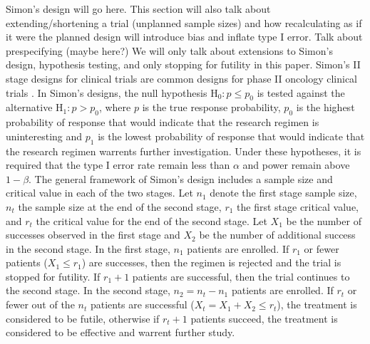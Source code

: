 \documentclass[12pt]{report}\usepackage[]{graphicx}\usepackage[]{color}
\newlength{\li}\setlength{\li}{14.48pt}
\newlength{\di}\setlength{\di}{-3.5mm}
\begin{document}
Simon's design will go here. This section will also talk about extending/shortening a trial (unplanned sample sizes) and how recalculating as if it were the planned design will introduce bias and inflate type I error. Talk about prespecifying (maybe here?)
\newline
We will only talk about extensions to Simon's design, hypothesis testing, and only stopping for futility in this paper.  
\newline
\textbf{}
\newline
\indent Simon's II stage designs for clinical trials are common designs for phase II oncology clinical trials \cite{Simon}. In Simon's designs, the null hypothesis $\mbox{H}_0: p \leq p_0$ is tested against the alternative $\mbox{H}_1: p > p_0$, where $p$ is the true response probability, $p_0$ is the highest probability of response that would indicate that the research regimen is uninteresting and $p_1$ is the lowest probability of response that would indicate that the research regimen warrents further investigation. Under these hypotheses, it is required that the type I error rate remain less than $\alpha$ and power remain above $1-\beta$. The general framework of Simon's design includes a sample size and critical value in each of the two stages. Let $n_1$ denote the first stage sample size, $n_t$ the sample size at the end of the second stage, $r_1$ the first stage critical value, and $r_t$ the critical value for the end of the second stage. Let $X_1$ be the number of successes observed in the first stage and $X_2$ be the number of additional success in the second stage. In the first stage, $n_1$ patients are enrolled. If $r_1$ or fewer patients ($X_1 \leq r_1$) are successes, then the regimen is rejected and the trial is stopped for futility. If $r_1 + 1$ patients are successful, then the trial continues to the second stage. In the second stage, $n_2 = n_t - n_1$ patients are enrolled. If $r_t$ or fewer out of the $n_t$ patients are successful ($X_t = X_1 + X_2 \leq r_t$), the treatment is considered to be futile, otherwise if $r_t + 1$ patients succeed, the treatment is considered to be effective and warrent further study.  \\
\end{document}
